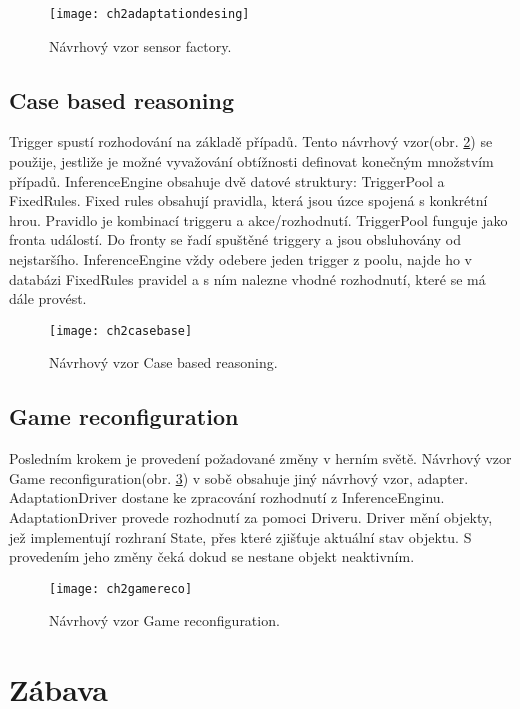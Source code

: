 \begin{figure}
  \centering
  \texttt{[image: ch2adaptationdesing]}
	\caption{Návrhový vzor sensor factory. \cite{SwPatterns} }
	\label{fig:ch2adaptationdesing}
\end{figure}

\subsection{Case based reasoning}

Trigger spustí rozhodování na základě případů. Tento návrhový vzor(obr. \ref{fig:ch2casebase}) se použije, jestliže je možné vyvažování obtížnosti definovat konečným množstvím případů. InferenceEngine obsahuje dvě datové struktury: TriggerPool a FixedRules. Fixed rules obsahují pravidla, která jsou úzce spojená s konkrétní hrou. Pravidlo je kombinací triggeru a akce/rozhodnutí. TriggerPool funguje jako fronta událostí. Do fronty se řadí spuštěné triggery a jsou obsluhovány od nejstaršího. InferenceEngine vždy odebere jeden trigger z poolu, najde ho v databázi FixedRules pravidel a s ním nalezne vhodné rozhodnutí, které se má dále provést.

\begin{figure}
  \centering
  \texttt{[image: ch2casebase]}
	\caption{Návrhový vzor Case based reasoning. \cite{SwPatterns} }
	\label{fig:ch2casebase}
\end{figure}

\subsection{Game reconfiguration}

Posledním krokem je provedení požadované změny v herním světě. Návrhový vzor Game reconfiguration(obr. \ref{fig:ch2gamereco}) v sobě obsahuje jiný návrhový vzor, adapter. AdaptationDriver dostane ke zpracování rozhodnutí z InferenceEnginu. AdaptationDriver provede rozhodnutí za pomoci Driveru. Driver mění objekty, jež implementují rozhraní State, přes které zjišťuje aktuální stav objektu. S provedením jeho změny čeká dokud se nestane objekt neaktivním.

\begin{figure}
  \centering
  \texttt{[image: ch2gamereco]}
	\caption{Návrhový vzor Game reconfiguration. \cite{SwPatterns} }
	\label{fig:ch2gamereco}
\end{figure}

\section{Zábava}

